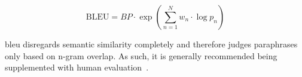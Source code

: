 \begin{equation}
    \text{BLEU} = BP \cdot \exp\left(\sum_{n=1}^{N} w_n \cdot \log p_n\right)
\label{eq:bleu_final}
\end{equation}

\ac{bleu} disregards semantic similarity completely and therefore judges paraphrases only based on n-gram overlap. 
As such, it is generally recommended being supplemented with human evaluation~\citep{zhou_paraphrase_2021}.





